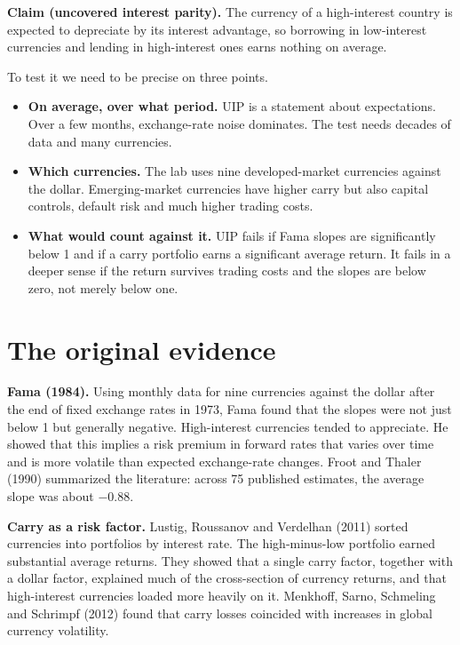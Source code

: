\begin{callout}
\textbf{Claim (uncovered interest parity).} The currency of a high-interest country is expected to depreciate by its interest advantage, so borrowing in low-interest currencies and lending in high-interest ones earns nothing on average.
\end{callout}

To test it we need to be precise on three points.

\begin{itemize}
  \item \textbf{On average, over what period.} UIP is a statement about expectations. Over a few months, exchange-rate noise dominates. The test needs decades of data and many currencies.
  \item \textbf{Which currencies.} The lab uses nine developed-market currencies against the dollar. Emerging-market currencies have higher carry but also capital controls, default risk and much higher trading costs.
  \item \textbf{What would count against it.} UIP fails if Fama slopes are significantly below 1 and if a carry portfolio earns a significant average return. It fails in a deeper sense if the return survives trading costs and the slopes are below zero, not merely below one.
\end{itemize}

\section{The original evidence}
\label{sec:18-evidence}

\textbf{Fama (1984).} Using monthly data for nine currencies against the dollar after the end of fixed exchange rates in 1973, Fama found that the slopes were not just below 1 but generally negative. High-interest currencies tended to appreciate. He showed that this implies a risk premium in forward rates that varies over time and is more volatile than expected exchange-rate changes. Froot and Thaler (1990) summarized the literature: across 75 published estimates, the average slope was about $-0.88$.

\textbf{Carry as a risk factor.} Lustig, Roussanov and Verdelhan (2011) sorted currencies into portfolios by interest rate. The high-minus-low portfolio earned substantial average returns. They showed that a single carry factor, together with a dollar factor, explained much of the cross-section of currency returns, and that high-interest currencies loaded more heavily on it. Menkhoff, Sarno, Schmeling and Schrimpf (2012) found that carry losses coincided with increases in global currency volatility.

